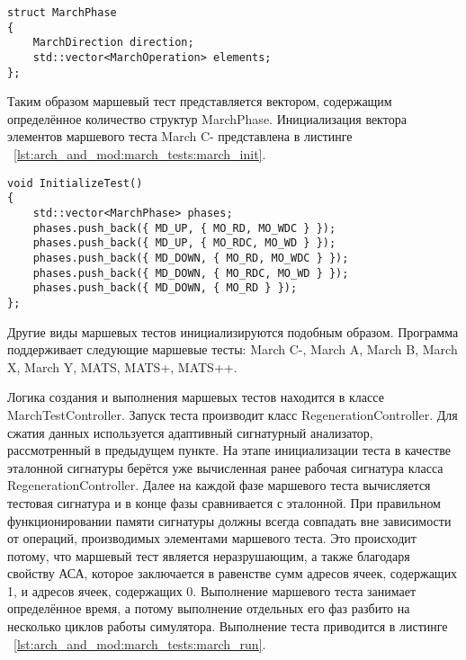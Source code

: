 \begin{lstlisting}[style=cplusplusstyle, caption={Структура фазы маршевого теста}, label=lst:arch_and_mod:march_tests:march_phase]
struct MarchPhase
{
    MarchDirection direction;
    std::vector<MarchOperation> elements;
};
\end{lstlisting} 

Таким образом маршевый тест представляется вектором, содержащим определённое количество структур MarchPhase. Инициализация вектора элементов маршевого теста March C- представлена в листинге ~\ref{lst:arch_and_mod:march_tests:march_init}.

\begin{lstlisting}[style=cplusplusstyle, caption={Инициализация вектора элементов маршевого теста March C-}, label=lst:arch_and_mod:march_tests:march_init]
void InitializeTest()
{
    std::vector<MarchPhase> phases;
    phases.push_back({ MD_UP, { MO_RD, MO_WDC } });
    phases.push_back({ MD_UP, { MO_RDC, MO_WD } });
    phases.push_back({ MD_DOWN, { MO_RD, MO_WDC } });
    phases.push_back({ MD_DOWN, { MO_RDC, MO_WD } });
    phases.push_back({ MD_DOWN, { MO_RD } });
};
\end{lstlisting} 

Другие виды маршевых тестов инициализируются подобным образом. Программа поддерживает следующие маршевые тесты: March C-, March A, March B, March X, March Y, MATS, MATS+, MATS++.

Логика создания и выполнения маршевых тестов находится в классе MarchTestController. Запуск теста производит класс RegenerationController. Для сжатия данных используется адаптивный сигнатурный анализатор, рассмотренный в предыдущем пункте. На этапе инициализации теста в качестве эталонной сигнатуры берётся уже вычисленная ранее рабочая сигнатура класса RegenerationController. Далее на каждой фазе маршевого теста вычисляется тестовая сигнатура и в конце фазы сравнивается с эталонной. При правильном функционировании памяти сигнатуры должны всегда совпадать вне зависимости от операций, производимых элементами маршевого теста. Это происходит потому, что маршевый тест является неразрушающим, а также благодаря свойству АСА, которое заключается в равенстве сумм адресов ячеек, содержащих 1, и адресов ячеек, содержащих 0. Выполнение маршевого теста занимает определённое время, а потому выполнение отдельных его фаз разбито на несколько циклов работы симулятора. Выполнение теста приводится в листинге ~\ref{lst:arch_and_mod:march_tests:march_run}.

